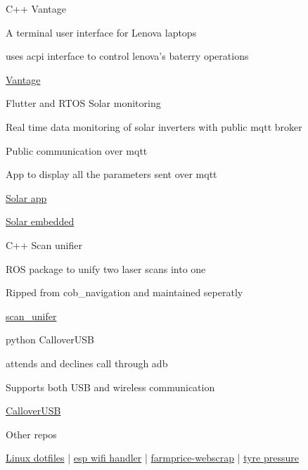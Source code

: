 \begin{cventries}
	\cventry
	{C++} %
	{Vantage} %
	{} %
	{} %
	{
		\begin{cvitems} %
			\item {A terminal user interface for Lenova laptops}
			\item {uses acpi interface to control lenova's baterry operations}
			\item {\href{https://github.com/gokulmaxi/vantage} { \faGithub \space Vantage}}
		\end{cvitems}
	}

	\cventry
	{Flutter and RTOS} %
	{Solar monitoring} %
	{} %
	{} %
	{
		\begin{cvitems} %
			\item {Real time data monitoring of solar inverters with public mqtt broker}
			\item {Public communication over mqtt }
			\item {App to display all the parameters sent over mqtt}
			\item {\href{https://github.com/gokulmaxi/solar-intern_app}{\faGithub \space Solar app}}
			\item {\href{https://github.com/gokulmaxi/solar_embedded}{\faGithub\space Solar embedded}}
		\end{cvitems}
	}
	\cventry
	{C++} %
	{Scan unifier} %
	{} %
	{} %
	{
		\begin{cvitems} %
			\item {ROS package to unify two laser scans into one}
			\item {Ripped from cob\_navigation and maintained seperatly}
			\item {\href{https://github.com/gokulmaxi/scan_unifier}{\faGithub \space scan\_unifer}}
		\end{cvitems}
	}
	\cventry
	{python}%
	{CalloverUSB} %
	{} %
	{} %
	{
		\begin{cvitems} %
			\item {attends and declines call through adb}
			\item {Supports both USB and wireless communication}
			\item {\href{https://github.com/gokulmaxi/pythoncalloverusb}{\faGithub \space CalloverUSB}}
		\end{cvitems}
	}
	\cventry
	{}%
	{Other repos} %
	{} %
	{} %
	{
		\begin{cvitems} %
			\item {\href{https://github.com/gokulmaxi/dotfiles}{\faGithub \space Linux dotfiles} | \href{https://github.com/gokulmaxi/espwifi_handler}{\faGithub \space esp wifi handler} | \href{https://github.com/gokulmaxi/farmprice-webscrap}{\faGithub \space farmprice-webscrap} | \href{https://github.com/gokulmaxi/BMP180_MC60}{\faGithub \space tyre pressure}}
		\end{cvitems}
	}

\end{cventries}
